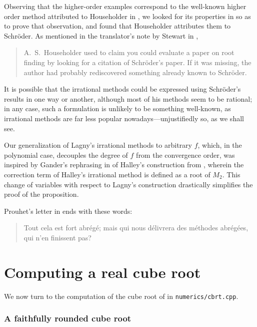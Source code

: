 ﻿\documentclass[10pt, a4paper, twoside]{basestyle}
\begin{document}
Observing that the higher-order examples correspond to the well-known higher order
method attributed to Householder in \cite{SebahGourdon2001}, we looked for its properties in \cite{Householder1970} so as to prove that observation, and found that Householder attributes
them to Schröder.
As mentioned in the translator’s note by Stewart in \cite{SchröderStewart1993},
\begin{quote}
A.~S.~Householder used to claim you could evaluate a paper on
root finding by looking for a citation of Schröder’s paper. If it was
missing, the author had probably rediscovered something already
known to Schröder.
\end{quote}
It is possible that the irrational methods could be expressed using Schröder’s results in one way or another, although most of his methods seem to be rational; in any case, such a formulation
is unlikely to be something well-known, as irrational methods are far less popular
nowadays---unjustifiedly so, as we shall see.

Our generalization of Lagny's irrational methods to arbitrary $f$, which, in the polynomial case,
decouples the degree of $f$ from the convergence order, was inspired by Gander's rephrasing in
\cite{Gander1985} of Halley's construction from \cite{Halley1694}, wherein the correction term of
Halley's irrational method is defined as a root of $M_2$. This change of variables with respect to
Lagny's construction drastically simplifies the proof of the proposition.

Prouhet’s letter in \cite{Cantor1861} ends with these words:
\begin{quote}\textfrench{%
Tout cela est fort abrégé; mais qui nous délivrera des méthodes abrégées,
qui n'en finissent pas?}\end{quote}

\part{Computing a real cube root}

We now turn to the computation of the cube root of in \texttt{numerics/cbrt.cpp}.

\section*{A faithfully rounded cube root}
\end{document}
